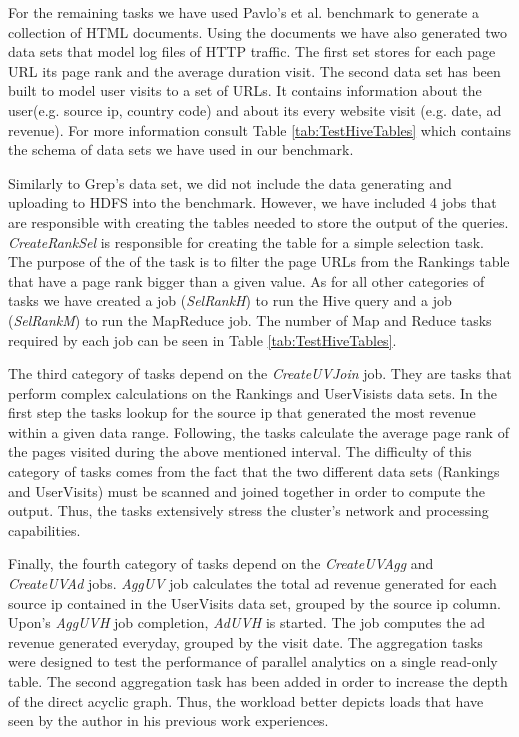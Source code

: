 \documentclass[11pt,a4paper,twoside]{report}
\begin{document}
For the remaining tasks we have used Pavlo's et al. benchmark to generate a collection of HTML documents. Using the documents we have also generated two data sets that model log files of HTTP traffic. The first set stores for each page URL its page rank and the average duration visit. The second data set has been built to model user visits to a set of URLs. It contains information about the user(e.g. source ip, country code) and about its every website visit (e.g. date, ad revenue). For more information consult Table \ref{tab:TestHiveTables} which contains the schema of data sets we have used in our benchmark.


Similarly to Grep's data set, we did not include the data generating and uploading to HDFS into the benchmark. However, we have included 4 jobs that are responsible with creating the tables needed to store the output of the queries. \textit{CreateRankSel} is responsible for creating the table for a simple selection task. The purpose of the of the task is to filter the page URLs from the Rankings table that have a page rank bigger than a given value. As for all other categories of tasks we have created a job (\textit{SelRankH}) to run the Hive query and a job (\textit{SelRankM}) to run the MapReduce job. The number of Map and Reduce tasks required by each job can be seen in Table \ref{tab:TestHiveTables}.


The third category of tasks depend on the \textit{CreateUVJoin} job. They are tasks that perform complex calculations on the Rankings and UserVisists data sets.
In the first step the tasks lookup for the source ip that generated the most revenue within a given data range. Following, the tasks calculate the average page rank of the pages visited during the above mentioned interval. The difficulty of this category of tasks comes from the fact that the two different data sets (Rankings and UserVisits) must be scanned and joined together in order to compute the output. Thus, the tasks extensively stress the cluster's network and processing capabilities.


Finally, the fourth category of tasks depend on the \textit{CreateUVAgg} and \textit{CreateUVAd} jobs. \textit{AggUV} job calculates the total ad revenue generated for each source ip contained in the UserVisits data set, grouped by the source ip column. Upon's \textit{AggUVH} job completion, \textit{AdUVH} is started. The job computes the ad revenue generated everyday, grouped by the visit date. The aggregation tasks were designed to test the performance of parallel analytics on a single read-only table. The second aggregation task has been added in order to increase the depth of the direct acyclic graph. Thus, the workload better depicts loads that have seen by the author in his previous work experiences.
 
\end{document}
